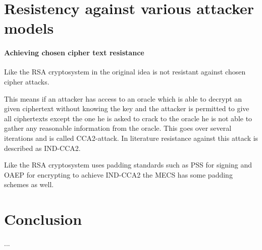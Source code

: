\section{Resistency against various attacker models}

\paragraph{Achieving chosen cipher text resistance}

Like the RSA cryptosystem in the original idea is not resistant against chosen cipher attacks. 

This means if an attacker has access to an oracle which is able to decrypt an given ciphertext without knowing the key and the attacker is permitted to give all ciphertexts except the one he is asked to crack to the oracle he is not able to gather any reasonable information from the oracle. This goes over several iterations and is called CCA2-attack. In literature resistance against this attack is described as IND-CCA2. 


Like the RSA cryptosystem uses padding standards such as PSS for signing and OAEP for encrypting to achieve IND-CCA2 the MECS has some padding schemes as well.

\section{Conclusion}
...
